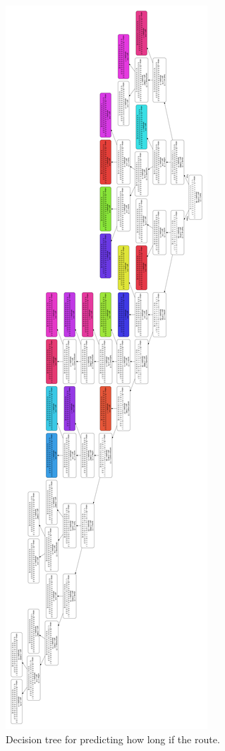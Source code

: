 \documentclass{sigchi}
\begin{document}
\begin{figure}[!h]
\centering
\includegraphics[width=2.0\columnwidth]{pics/decisionTree_7.png}
\caption{Decision tree for predicting how long if the route.}
\label{fig:dt7}
\end{figure}
\end{document}
